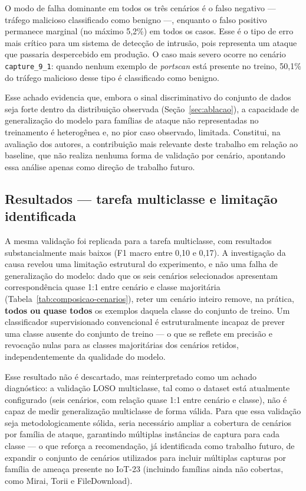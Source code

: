 O modo de falha dominante em todos os três cenários é o falso negativo — tráfego malicioso classificado como benigno —, enquanto o falso positivo permanece marginal (no máximo 5,2\%) em todos os casos. Esse é o tipo de erro mais crítico para um sistema de detecção de intrusão, pois representa um ataque que passaria despercebido em produção. O caso mais severo ocorre no cenário \texttt{capture\_9\_1}: quando nenhum exemplo de \textit{portscan} está presente no treino, 50,1\% do tráfego malicioso desse tipo é classificado como benigno.

Esse achado evidencia que, embora o sinal discriminativo do conjunto de dados seja forte dentro da distribuição observada (Seção~\ref{sec:ablacao}), a capacidade de generalização do modelo para famílias de ataque não representadas no treinamento é heterogênea e, no pior caso observado, limitada. Constitui, na avaliação dos autores, a contribuição mais relevante deste trabalho em relação ao baseline, que não realiza nenhuma forma de validação por cenário, apontando essa análise apenas como direção de trabalho futuro.

\subsection{Resultados — tarefa multiclasse e limitação identificada}
\label{sec:loso-multiclasse}

A mesma validação foi replicada para a tarefa multiclasse, com resultados substancialmente mais baixos (F1 macro entre 0{,}10 e 0{,}17). A investigação da causa revelou uma limitação estrutural do experimento, e não uma falha de generalização do modelo: dado que os seis cenários selecionados apresentam correspondência quase 1:1 entre cenário e classe majoritária (Tabela~\ref{tab:composicao-cenarios}), reter um cenário inteiro remove, na prática, \textbf{todos ou quase todos} os exemplos daquela classe do conjunto de treino. Um classificador supervisionado convencional é estruturalmente incapaz de prever uma classe ausente do conjunto de treino — o que se reflete em precisão e revocação nulas para as classes majoritárias dos cenários retidos, independentemente da qualidade do modelo.

Esse resultado não é descartado, mas reinterpretado como um achado diagnóstico: a validação LOSO multiclasse, tal como o dataset está atualmente configurado (seis cenários, com relação quase 1:1 entre cenário e classe), não é capaz de medir generalização multiclasse de forma válida. Para que essa validação seja metodologicamente sólida, seria necessário ampliar a cobertura de cenários por família de ataque, garantindo múltiplas instâncias de captura para cada classe — o que reforça a recomendação, já identificada como trabalho futuro, de expandir o conjunto de cenários utilizados para incluir múltiplas capturas por família de ameaça presente no IoT-23 (incluindo famílias ainda não cobertas, como Mirai, Torii e FileDownload).

